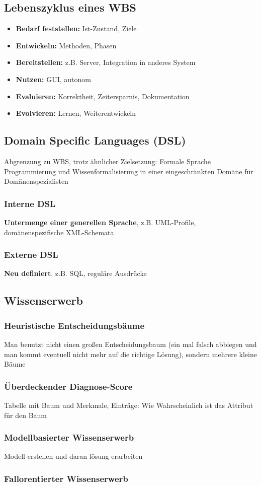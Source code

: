 \documentclass[14pt]{article}
\begin{document}
    \subsection{Lebenszyklus eines WBS}
    \begin{itemize}
        \item \textbf{Bedarf feststellen:} Ist-Zustand, Ziele
        \item \textbf{Entwickeln:} Methoden, Phasen
        \item \textbf{Bereitstellen:} z.B. Server, Integration in 
        anderes System
        \item \textbf{Nutzen:} GUI, autonom
        \item \textbf{Evaluieren:} Korrektheit, Zeitersparnis,
        Dokumentation
        \item \textbf{Evolvieren:} Lernen, Weiterentwickeln
    \end{itemize}

    \subsection{Domain Specific Languages (DSL)}
    Abgrenzung zu WBS, trotz ähnlicher Zielsetzung: Formale Sprache 
    Programmierung und Wissenformalisierung in einer eingeschränkten
    Domäne für Domänenspezialisten \\
    \subsubsection{Interne DSL}
    \textbf{Untermenge einer generellen Sprache}, z.B. UML-Profile, 
    domänenspezifische XML-Schemata
    \subsubsection{Externe DSL}
    \textbf{Neu definiert}, z.B. SQL, reguläre Ausdrücke

    \subsection{Wissenserwerb}
    \subsubsection{Heuristische Entscheidungsbäume}
        Man benutzt nicht einen großen Entscheidungsbaum (ein mal 
        falsch abbiegen und man kommt eventuell nicht mehr auf
        die richtige Lösung), sondern mehrere kleine Bäume
    \subsubsection{Überdeckender Diagnose-Score}
        Tabelle mit Baum und Merkmale, Einträge: Wie 
        Wahrscheinlich ist das Attribut für den Baum
    \subsubsection{Modellbasierter Wissenserwerb}
        Modell erstellen und daran lösung erarbeiten
    \subsubsection{Fallorentierter Wissenserwerb}
\end{document}
